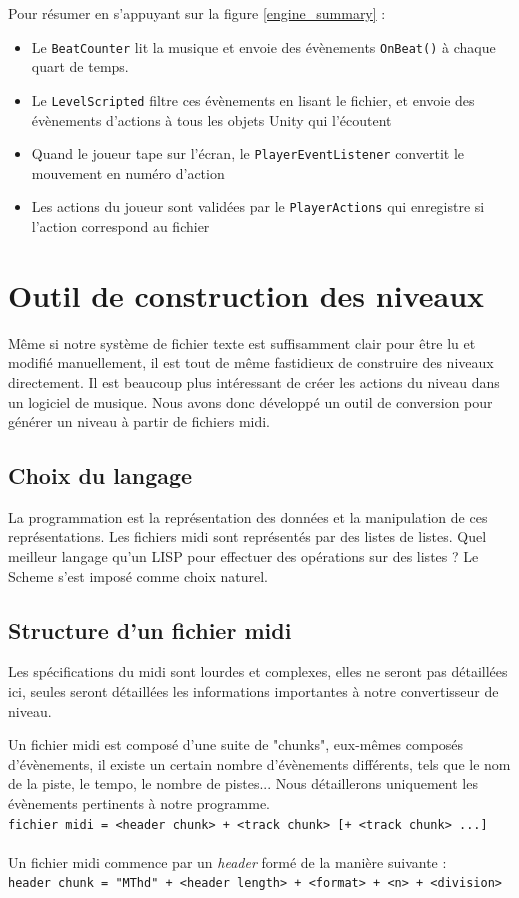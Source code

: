Pour résumer en s'appuyant sur la figure \ref{engine_summary} :
\begin{itemize}
\item Le \texttt{BeatCounter} lit la musique et envoie des évènements \texttt{OnBeat()} à chaque quart de temps.
\item Le \texttt{LevelScripted} filtre ces évènements en lisant le fichier, et envoie des évènements d'actions à tous les objets Unity qui l'écoutent
\item Quand le joueur tape sur l'écran, le \texttt{PlayerEventListener} convertit le mouvement en numéro d'action
\item Les actions du joueur sont validées par le \texttt{PlayerActions} qui enregistre si l'action correspond au fichier
\end{itemize}

\section{Outil de construction des niveaux}

Même si notre système de fichier texte est suffisamment clair pour être lu et modifié manuellement, il est tout de même fastidieux de construire des niveaux directement. Il est beaucoup plus intéressant de créer les actions du niveau dans un logiciel de musique. Nous avons donc développé un outil de conversion pour générer un niveau à partir de fichiers midi.

\subsection{Choix du langage}
La programmation est la représentation des données et la manipulation de ces représentations. Les fichiers midi sont représentés par des listes de listes. Quel meilleur langage qu'un LISP pour effectuer des opérations sur des listes ? Le Scheme s'est imposé comme choix naturel.

\subsection{Structure d'un fichier midi}
Les spécifications du midi sont lourdes et complexes, elles ne seront pas détaillées ici, seules seront détaillées les informations importantes à notre convertisseur de niveau.

Un fichier midi est composé d'une suite de "chunks", eux-mêmes composés d'évènements, il existe un certain nombre d'évènements différents, tels que le nom de la piste, le tempo, le nombre de pistes... Nous détaillerons uniquement les évènements pertinents à notre programme.\\
{\small \texttt{fichier midi = <header chunk> + <track chunk> [+ <track chunk> ...]}}\\\\
Un fichier midi commence par un \textit{header} formé de la manière suivante :\\
{\small \texttt{header chunk = "MThd" + <header length> + <format> + <n> + <division>}}\\

